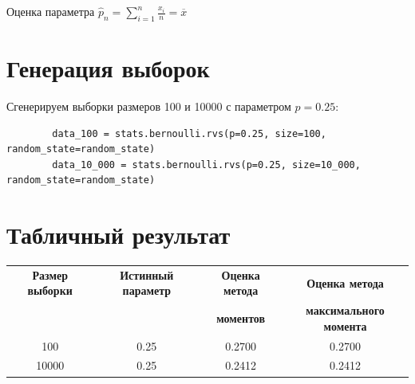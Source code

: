 \documentclass[a4paper,14pt]{extarticle}
\begin{document}
    Оценка параметра $\displaystyle \hat{p}_n = \sum_{i = 1}^n \frac{x_i}{n} = \overline{x}$

    \section{Генерация выборок}

    Сгенерируем выборки размеров 100 и 10000 с параметром $p = 0.25$:
    \begin{verbatim}
        data_100 = stats.bernoulli.rvs(p=0.25, size=100, random_state=random_state)
        data_10_000 = stats.bernoulli.rvs(p=0.25, size=10_000, random_state=random_state)
    \end{verbatim}

    \section{Табличный результат}

    \begin{table}[h!]
        \centering
        \label{tab:results_lines}
        \small
        \begin{tabular}{|c|c|c|c|}
            \hline
            \textbf{Размер выборки} & \textbf{Истинный параметр} & \textbf{Оценка метода} & \textbf{Оценка метода} \\ 
                                    &                            & \textbf{моментов}               & \textbf{максимального момента} \\ \hline
            100 & 0.25 & 0.2700 & 0.2700 \\ \hline
            10000 & 0.25 & 0.2412 & 0.2412 \\ \hline
        \end{tabular}
    \end{table}
\end{document}
